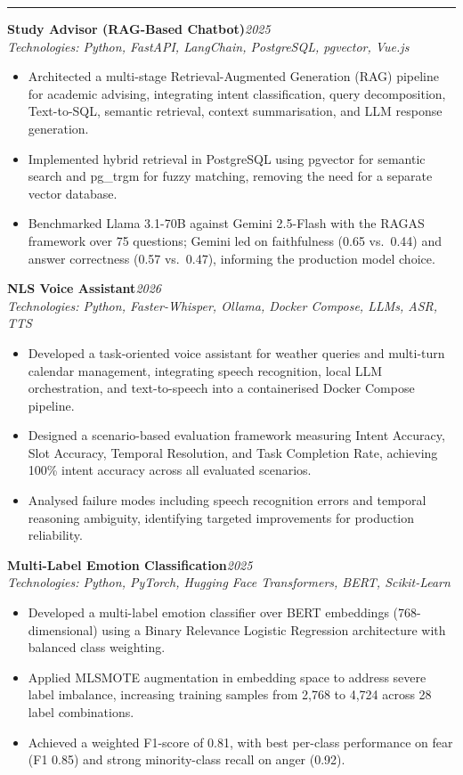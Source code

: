 \documentclass[10pt,a4paper]{article}
\renewcommand{\section}[1]{%
  \par\vspace{7pt}%
  \noindent{\large\bfseries\color{headerblue}#1}\par\vspace{2pt}%
  \noindent\hrule\par\vspace{3pt}%
}
\newcommand{\project}[3]{%
  \noindent\textbf{#1}\hfill\textit{\small #3}\\[0pt]%
  {\small\textit{\color{darkgray}Technologies: #2}}\par\vspace{2pt}%
}
\newcommand{\vsm}{\vspace{5pt}}
\begin{document}
\section{PROJECTS}
\project{Study Advisor (RAG-Based Chatbot)}
{Python, FastAPI, LangChain, PostgreSQL, pgvector, Vue.js}
{2025}
\begin{itemize}
\item Architected a multi-stage Retrieval-Augmented Generation (RAG) pipeline for academic
advising, integrating intent classification, query decomposition, Text-to-SQL, semantic
retrieval, context summarisation, and LLM response generation.
\item Implemented hybrid retrieval in PostgreSQL using pgvector for semantic search and
pg\_trgm for fuzzy matching, removing the need for a separate vector database.
\item Benchmarked Llama 3.1-70B against Gemini 2.5-Flash with the RAGAS framework over 75
questions; Gemini led on faithfulness (0.65 vs.\ 0.44) and answer correctness (0.57 vs.\ 0.47),
informing the production model choice.
\end{itemize}
\vsm
\project{NLS Voice Assistant}
{Python, Faster-Whisper, Ollama, Docker Compose, LLMs, ASR, TTS}
{2026}
\begin{itemize}
\item Developed a task-oriented voice assistant for weather queries and multi-turn calendar
management, integrating speech recognition, local LLM orchestration, and text-to-speech into a
containerised Docker Compose pipeline.
\item Designed a scenario-based evaluation framework measuring Intent Accuracy, Slot Accuracy,
Temporal Resolution, and Task Completion Rate, achieving 100\% intent accuracy across all
evaluated scenarios.
\item Analysed failure modes including speech recognition errors and temporal reasoning
ambiguity, identifying targeted improvements for production reliability.
\end{itemize}
\vsm
\project{Multi-Label Emotion Classification}
{Python, PyTorch, Hugging Face Transformers, BERT, Scikit-Learn}
{2025}
\begin{itemize}
\item Developed a multi-label emotion classifier over BERT embeddings (768-dimensional) using a
Binary Relevance Logistic Regression architecture with balanced class weighting.
\item Applied MLSMOTE augmentation in embedding space to address severe label imbalance,
increasing training samples from 2,768 to 4,724 across 28 label combinations.
\item Achieved a weighted F1-score of 0.81, with best per-class performance on fear (F1 0.85)
and strong minority-class recall on anger (0.92).
\end{itemize}
\end{document}
